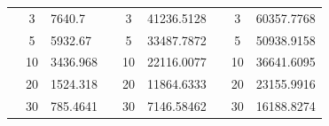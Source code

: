 \begin{table}[]
\begin{tabular}{|cclcclccl|}
\rowcolor[HTML]{DAE8FC} 
\multicolumn{1}{|c|}{\cellcolor[HTML]{FFFFC7}}                       & \multicolumn{1}{c|}{\cellcolor[HTML]{DAE8FC}3}         & \multicolumn{1}{l|}{\cellcolor[HTML]{DAE8FC}7640.7}     & \multicolumn{1}{c|}{\cellcolor[HTML]{FFFFC7}}                       & \multicolumn{1}{c|}{\cellcolor[HTML]{DAE8FC}3}         & \multicolumn{1}{l|}{\cellcolor[HTML]{DAE8FC}41236.5128} & \multicolumn{1}{c|}{\cellcolor[HTML]{FFFFC7}}                       & \multicolumn{1}{c|}{\cellcolor[HTML]{DAE8FC}3}         & 60357.7768 \\ \cline{2-3} \cline{5-6} \cline{8-9} 
\rowcolor[HTML]{DDFDFF} 
\multicolumn{1}{|c|}{\cellcolor[HTML]{FFFFC7}}                       & \multicolumn{1}{c|}{\cellcolor[HTML]{DDFDFF}5}         & \multicolumn{1}{l|}{\cellcolor[HTML]{DDFDFF}5932.67}    & \multicolumn{1}{c|}{\cellcolor[HTML]{FFFFC7}}                       & \multicolumn{1}{c|}{\cellcolor[HTML]{DDFDFF}5}         & \multicolumn{1}{l|}{\cellcolor[HTML]{DDFDFF}33487.7872} & \multicolumn{1}{c|}{\cellcolor[HTML]{FFFFC7}}                       & \multicolumn{1}{c|}{\cellcolor[HTML]{DDFDFF}5}         & 50938.9158 \\ \cline{2-3} \cline{5-6} \cline{8-9} 
\rowcolor[HTML]{DAE8FC} 
\multicolumn{1}{|c|}{\cellcolor[HTML]{FFFFC7}}                       & \multicolumn{1}{c|}{\cellcolor[HTML]{DAE8FC}10}        & \multicolumn{1}{l|}{\cellcolor[HTML]{DAE8FC}3436.968}   & \multicolumn{1}{c|}{\cellcolor[HTML]{FFFFC7}}                       & \multicolumn{1}{c|}{\cellcolor[HTML]{DAE8FC}10}        & \multicolumn{1}{l|}{\cellcolor[HTML]{DAE8FC}22116.0077} & \multicolumn{1}{c|}{\cellcolor[HTML]{FFFFC7}}                       & \multicolumn{1}{c|}{\cellcolor[HTML]{DAE8FC}10}        & 36641.6095 \\ \cline{2-3} \cline{5-6} \cline{8-9} 
\rowcolor[HTML]{DDFDFF} 
\multicolumn{1}{|c|}{\cellcolor[HTML]{FFFFC7}}                       & \multicolumn{1}{c|}{\cellcolor[HTML]{DDFDFF}20}        & \multicolumn{1}{l|}{\cellcolor[HTML]{DDFDFF}1524.318}   & \multicolumn{1}{c|}{\cellcolor[HTML]{FFFFC7}}                       & \multicolumn{1}{c|}{\cellcolor[HTML]{DDFDFF}20}        & \multicolumn{1}{l|}{\cellcolor[HTML]{DDFDFF}11864.6333} & \multicolumn{1}{c|}{\cellcolor[HTML]{FFFFC7}}                       & \multicolumn{1}{c|}{\cellcolor[HTML]{DDFDFF}20}        & 23155.9916 \\ \cline{2-3} \cline{5-6} \cline{8-9} 
\rowcolor[HTML]{DAE8FC} 
\multicolumn{1}{|c|}{\cellcolor[HTML]{FFFFC7}}                       & \multicolumn{1}{c|}{\cellcolor[HTML]{DAE8FC}30}        & \multicolumn{1}{l|}{\cellcolor[HTML]{DAE8FC}785.4641}   & \multicolumn{1}{c|}{\cellcolor[HTML]{FFFFC7}}                       & \multicolumn{1}{c|}{\cellcolor[HTML]{DAE8FC}30}        & \multicolumn{1}{l|}{\cellcolor[HTML]{DAE8FC}7146.58462} & \multicolumn{1}{c|}{\cellcolor[HTML]{FFFFC7}}                       & \multicolumn{1}{c|}{\cellcolor[HTML]{DAE8FC}30}        & 16188.8274 \\ \cline{2-3} \cline{5-6} \cline{8-9} 

\end{tabular}
\end{table}
